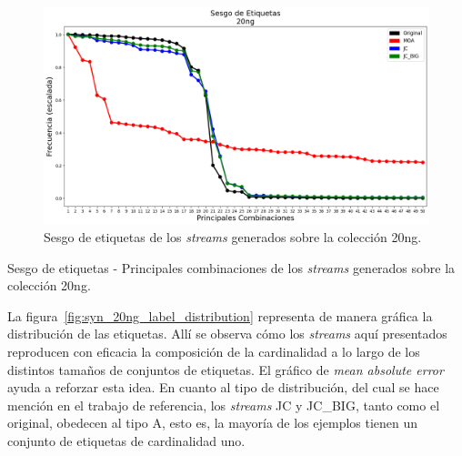 \begin{figure}[htbp]
	\includegraphics[width=\linewidth]{figures/experiments/syn/20ng/label_skew.png}
	\caption{Sesgo de etiquetas de los \textit{streams} generados sobre la colección
		20ng.}
	\label{fig:syn_20ng_label_skew}
\end{figure}

\begin{table}[htbp]
	\centering
	\begin{adjustbox}{max width=\textwidth}
		
	\end{adjustbox}
	\caption{Sesgo de etiquetas - Principales combinaciones de los
		\textit{streams} generados sobre la colección 20ng.}
	\label{tab:syn_20ng_top_labels_combinations}
\end{table}

La figura~\ref{fig:syn_20ng_label_distribution} representa de manera gráfica la
distribución de las etiquetas. Allí se observa cómo los \textit{streams} aquí
presentados reproducen con eficacia la composición de la cardinalidad a lo largo
de los distintos tamaños de conjuntos de etiquetas. El gráfico de \textit{mean
	absolute error} ayuda a reforzar esta idea. En cuanto al tipo de distribución,
del cual se hace mención en el trabajo de referencia, los \textit{streams} JC y
JC\_BIG, tanto como el original, obedecen al tipo A, esto es, la mayoría de los
ejemplos tienen un conjunto de etiquetas de cardinalidad uno.


